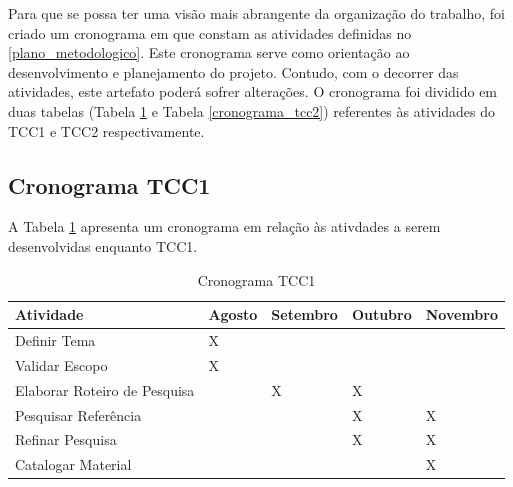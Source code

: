 Para que se possa ter uma visão mais abrangente da organização do trabalho, foi criado um cronograma em que constam as atividades definidas no \ref{plano_metodologico}. Este cronograma serve como orientação ao desenvolvimento e planejamento do projeto. Contudo, com o decorrer das atividades, este artefato poderá sofrer alterações. O cronograma foi dividido em duas tabelas (Tabela \ref{cronograma_tcc1} e Tabela \ref{cronograma_tcc2}) referentes às atividades do TCC1 e TCC2 respectivamente.

\subsection{Cronograma TCC1}
A Tabela \ref{cronograma_tcc1} apresenta um cronograma em relação às ativdades a serem desenvolvidas enquanto TCC1.

\begin{table}[h!]
\centering
\caption{Cronograma TCC1}
\label{cronograma_tcc1}
\begin{tabular}{lllll}
\textbf{Atividade}           & \textbf{Agosto} & \textbf{Setembro} & \textbf{Outubro} & \textbf{Novembro} \\ \hline
Definir Tema                 & X               &                   &                  &                   \\ \hline
Validar Escopo               & X               &                   &                  &                   \\ \hline
Elaborar Roteiro de Pesquisa &                 & X                 & X                &                   \\ \hline
Pesquisar Referência         &                 &                   & X                & X                 \\ \hline
Refinar Pesquisa             &                 &                   & X                & X                 \\ \hline
Catalogar Material           &                 &                   &                  & X                 \\ \hline
\end{tabular}
\end{table}

